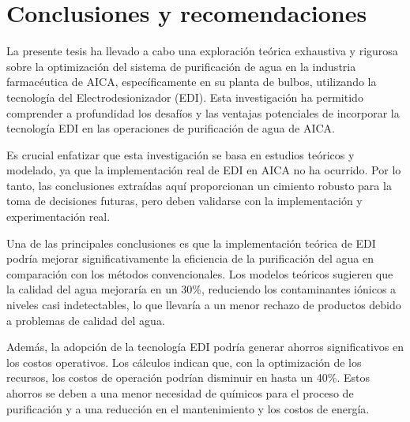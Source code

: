 \chapter{Conclusiones y recomendaciones}


La presente tesis ha llevado a cabo una
exploración teórica exhaustiva y rigurosa sobre la
optimización del sistema de purificación de agua en la industria
farmacéutica de AICA, específicamente en su planta de bulbos,
utilizando la tecnología del Electrodesionizador (EDI).
Esta investigación ha permitido comprender a profundidad
los desafíos y las ventajas potenciales de incorporar la
tecnología EDI en las operaciones de purificación de agua de AICA.

Es crucial enfatizar que esta investigación se basa en estudios teóricos y
modelado, ya que la implementación real de EDI en AICA no ha ocurrido.
Por lo tanto, las conclusiones extraídas aquí proporcionan un cimiento
robusto para la toma de decisiones futuras, pero deben validarse con la
implementación y experimentación real.

Una de las principales conclusiones es que la implementación teórica de
EDI podría mejorar significativamente la eficiencia de la purificación
del agua en comparación con los métodos convencionales. Los modelos
teóricos sugieren que la calidad del agua mejoraría en un 30\%,
reduciendo los contaminantes iónicos a niveles casi indetectables, lo que
llevaría a un menor rechazo de productos debido a problemas de calidad del agua.

Además, la adopción de la tecnología EDI podría generar ahorros significativos
en los costos operativos. Los cálculos indican que, con la optimización de
los recursos, los costos de operación podrían disminuir en hasta un 40\%.
Estos ahorros se deben a una menor necesidad de químicos para el proceso de
purificación y a una reducción en el mantenimiento y los costos de energía.




